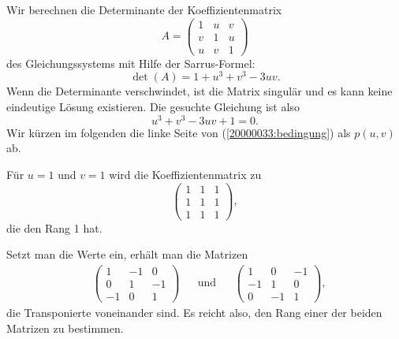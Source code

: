 \begin{loesung}
\begin{teilaufgaben}
\item
Wir berechnen die Determinante der Koeffizientenmatrix
\[
A=\begin{pmatrix}
1&u&v\\
v&1&u\\
u&v&1
\end{pmatrix}
\]
des Gleichungssystems mit Hilfe der Sarrus-Formel:
\[
\det(A)
=
1+u^3+v^3-3uv.
\]
Wenn die Determinante verschwindet, ist die Matrix singulär und es kann
keine eindeutige Lösung existieren.
Die gesuchte Gleichung ist also
\begin{equation}
u^3+v^3-3uv+1=0.
\label{20000033:bedingung}
\end{equation}
Wir kürzen im folgenden die linke Seite von (\ref{20000033:bedingung})
als $p(u,v)$ ab.
\item
Für $u=1$ und $v=1$ wird die Koeffizientenmatrix zu
\[
\begin{pmatrix}
1&1&1\\
1&1&1\\
1&1&1
\end{pmatrix},
\]
die den Rang 1 hat.
\item
Setzt man die Werte ein, erhält man die Matrizen
\begin{align*}
&\begin{pmatrix}
1&-1&0\\
0&1&-1\\
-1&0&1
\end{pmatrix}
&
&\text{und}&
&\begin{pmatrix}
1&0&-1\\
-1&1&0\\
0&-1&1
\end{pmatrix},
\end{align*}
die Transponierte voneinander sind.
Es reicht also, den Rang einer der beiden Matrizen zu bestimmen.


\end{teilaufgaben}
\end{loesung}
